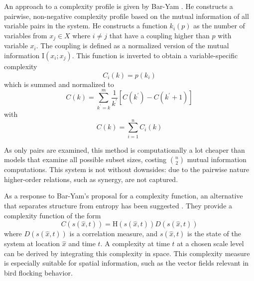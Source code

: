 \documentclass[../main.tex]{subfiles}
\begin{document}
An approach to a complexity profile is given by Bar-Yam \cite{bar2013computationally}.
He constructs a pairwise, non-negative complexity profile based on the mutual information of all variable pairs in the system.
He constructs a function $k_i (p)$ as the number of variables from $x_j \in X$ where $i \ne j$ that have a coupling higher than $p$ with variable $x_i$.
The coupling is defined as a normalized version of the mutual information $\mathrm{I}\left( x_i;x_j \right)$.
This function is inverted to obtain a variable-specific complexity
\begin{equation}
\overset{~}{C}_i\left( k \right)  = p \left( k_i\right)
\end{equation}
%
which is summed and normalized to
%
\begin{equation}
C\left( k \right)  = \sum_{k^\prime= k}^m \frac{1}{k^\prime} [\overset{~}{C} \left( k^\prime \right) - \overset{~}{C} \left( k^\prime + 1 \right) ]
\end{equation}
%
with
%
\begin{equation}
\overset{~}{C} \left( k \right)  = \sum_{i=1}^n \overset{~}{C}_i \left( k \right) 
\end{equation}

As only pairs are examined, this method is computationally a lot cheaper than models that examine all possible subset sizes, costing $\binom{n}{2}$ mutual information computations.
This system is not without downsides: due to the pairwise nature higher-order relations, such as synergy, are not captured.

As a response to Bar-Yam's proposal for a complexity function, an alternative that separates structure from entropy has been suggested \cite{arbona2014statistical}.
They provide a complexity function of the form
%
\begin{equation}
C\left( s\left( \hat{x},t \right) \right) = \mathrm{H}\left( s\left( \hat{x},t \right) \right) D\left( s\left( \hat{x},t \right) \right)
\end{equation}
%
where $D\left( s\left( \hat{x},t \right) \right)$ is a correlation measure, and $s\left( \hat{x},t \right) $ is the state of the system at location $\hat{x}$ and time $t$.
A complexity at time $t$ at a chosen scale level can be derived by integrating this complexity in space.
This complexity measure is especially suitable for spatial information, such as the vector fields relevant in bird flocking behavior.
\end{document}
